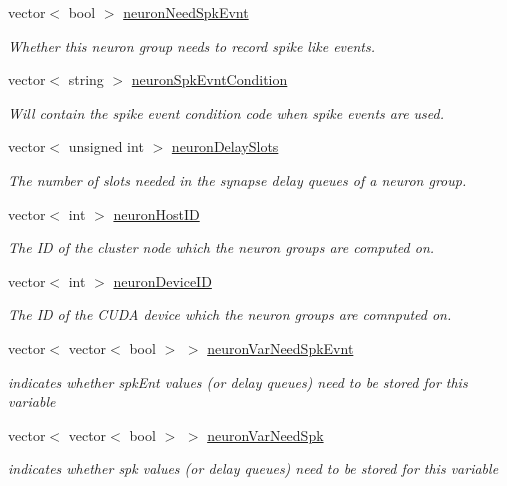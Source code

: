 \begin{DoxyCompactItemize}
vector$<$ bool $>$ \hyperlink{classNNmodel_abd22d449a48437fbf4e090b553f471f8}{neuron\+Need\+Spk\+Evnt}
\begin{DoxyCompactList}\small\item\em Whether this neuron group needs to record spike like events. \end{DoxyCompactList}\item 
vector$<$ string $>$ \hyperlink{classNNmodel_a2107fc30756637a876374ad35d69a19b}{neuron\+Spk\+Evnt\+Condition}
\begin{DoxyCompactList}\small\item\em Will contain the spike event condition code when spike events are used. \end{DoxyCompactList}\item 
vector$<$ unsigned int $>$ \hyperlink{classNNmodel_a0801942c5e41585da01b2c341f1e9f55}{neuron\+Delay\+Slots}
\begin{DoxyCompactList}\small\item\em The number of slots needed in the synapse delay queues of a neuron group. \end{DoxyCompactList}\item 
vector$<$ int $>$ \hyperlink{classNNmodel_a1ddf63324795faf42f32e4cf4a82a0e2}{neuron\+Host\+I\+D}
\begin{DoxyCompactList}\small\item\em The I\+D of the cluster node which the neuron groups are computed on. \end{DoxyCompactList}\item 
vector$<$ int $>$ \hyperlink{classNNmodel_a67ec0b349b4f423712b7636a3cc2fa1e}{neuron\+Device\+I\+D}
\begin{DoxyCompactList}\small\item\em The I\+D of the C\+U\+D\+A device which the neuron groups are comnputed on. \end{DoxyCompactList}\item 
vector$<$ vector$<$ bool $>$ $>$ \hyperlink{classNNmodel_a6cd30ae92d9eef399beb66098d016774}{neuron\+Var\+Need\+Spk\+Evnt}
\begin{DoxyCompactList}\small\item\em indicates whether spk\+Ent values (or delay queues) need to be stored for this variable \end{DoxyCompactList}\item 
vector$<$ vector$<$ bool $>$ $>$ \hyperlink{classNNmodel_a69a2c9a2317316d0eddf4033779f17cc}{neuron\+Var\+Need\+Spk}
\begin{DoxyCompactList}\small\item\em indicates whether spk values (or delay queues) need to be stored for this variable \end{DoxyCompactList}\item 

\end{DoxyCompactItemize}
